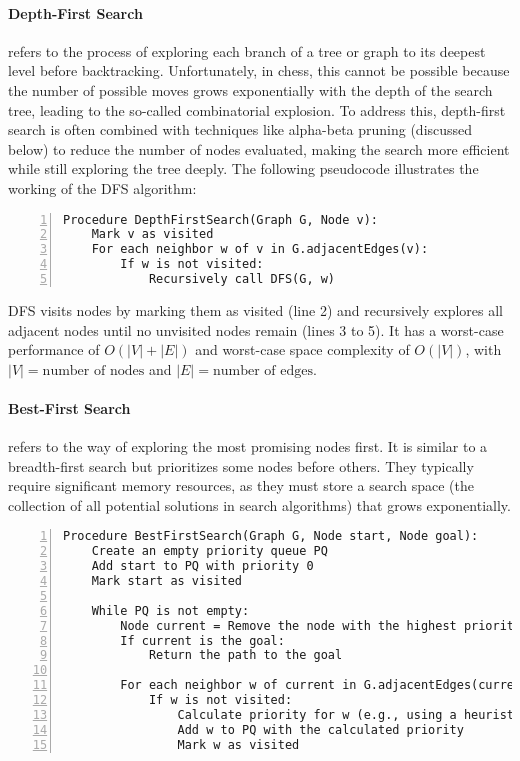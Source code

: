 \paragraph{Depth-First Search} refers to the process of exploring each branch of a tree or graph to its deepest level before backtracking. Unfortunately, in chess, this cannot be possible because the number of possible moves grows exponentially with the depth of the search tree, leading to the so-called combinatorial explosion. To address this, depth-first search is often combined with techniques like alpha-beta pruning (discussed below) to reduce the number of nodes evaluated, making the search more efficient while still exploring the tree deeply. The following pseudocode illustrates the working of the DFS algorithm:

\begin{lstlisting}[caption={Pseudocode of the Depth-First Search algorithm.}, frame=single, numbers=left, xleftmargin=15pt]
Procedure DepthFirstSearch(Graph G, Node v):
    Mark v as visited
    For each neighbor w of v in G.adjacentEdges(v):
        If w is not visited:
            Recursively call DFS(G, w)
\end{lstlisting}

DFS visits nodes by marking them as visited (line 2) and recursively explores all adjacent nodes until no unvisited nodes remain (lines 3 to 5). It has a worst-case performance of $O(|V| + |E|)$ and worst-case space complexity of $O(|V|)$, with $|V| = \text{number of nodes}$ and $|E| = \text{number of edges}$.

\paragraph{Best-First Search} refers to the way of exploring the most promising nodes first. It is similar to a breadth-first search but prioritizes some nodes before others. They typically require significant memory resources, as they must store a search space (the collection of all potential solutions in search algorithms) that grows exponentially.

\begin{lstlisting}[caption={Pseudocode of the Best-First Search algorithm.}, frame=single, numbers=left, xleftmargin=10pt, breaklines=true]
Procedure BestFirstSearch(Graph G, Node start, Node goal):
    Create an empty priority queue PQ
    Add start to PQ with priority 0
    Mark start as visited

    While PQ is not empty:
        Node current = Remove the node with the highest priority from PQ
        If current is the goal:
            Return the path to the goal

        For each neighbor w of current in G.adjacentEdges(current):
            If w is not visited:
                Calculate priority for w (e.g., using a heuristic)
                Add w to PQ with the calculated priority
                Mark w as visited
\end{lstlisting}


